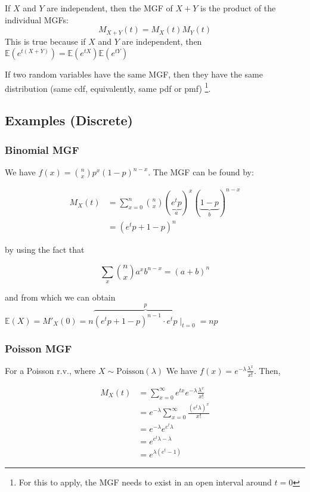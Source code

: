 \documentclass{article}
\begin{document}
\begin{theorem}
    If $X$ and $Y$ are independent, then the MGF of $X + Y$ is the product of the individual MGFs:
    \begin{equation}
        M_{X+Y} (t) = M_X(t)M_Y(t)
    \end{equation}
    \noindent This is true because if $X$ and $Y$ are independent, then $\mathbb{E}(e^{t(X+Y)}) = \mathbb{E}(e^{tX})\mathbb{E}(e^{tY})$ 
\end{theorem}

\begin{theorem}
    If two random variables have the same MGF, then they have the same distribution (same cdf, equivalently, same pdf or pmf) \footnote{For this to apply, the MGF needs to exist in an open interval around $t=0$}.
\end{theorem}

\subsection{Examples (Discrete)}

\subsubsection{Binomial MGF}
We have $f(x) = \binom{n}{x} p^{x} (1-p)^{n-x}$. The MGF can be found by:

\begin{align}
    M_{X} (t) &= \sum_{x=0}^{n} \binom{n}{x} (\underbrace{e^{t}p}_{a})^{x} (\underbrace{1-p}_b)^{n-x} \\ \nonumber
    &= (e^{t}p + 1-p)^{n}
\end{align}

\noindent by using the fact that 

\begin{equation*}
    \sum_{x} \binom{n}{x} a^{x} b^{n-x} = (a + b)^{n} 
\end{equation*}

\noindent and from which we can obtain $\mathbb{E}(X) = M'_X(0) = n \overbrace{(e^{t}p + 1 - p)^{n-1} \cdot e^{t}p \mid_{t=0}}^{p} = np$

\subsubsection{Poisson MGF}
For a Poisson r.v., where $X \sim \text{Poisson}(\lambda)$ We have $f(x) = e^{-\lambda} \frac{\lambda^{x}}{x!}$. Then,

\begin{align}
    M_X (t) &= \sum_{x=0}^{\infty} e^{tx} e^{-\lambda} \frac{\lambda^{x}}{x!} \\ \nonumber
    &= e^{-\lambda} \sum_{x=0}^{\infty} \frac{(e^{t}\lambda)^{x}}{x!} \\ \nonumber
    &= e^{-\lambda} e^{e^{t}\lambda} \\ \nonumber
    &= e^{e^{t}\lambda - \lambda} \\ \nonumber
    &= e^{\lambda(e^{t} - 1)}
\end{align}
\end{document}
